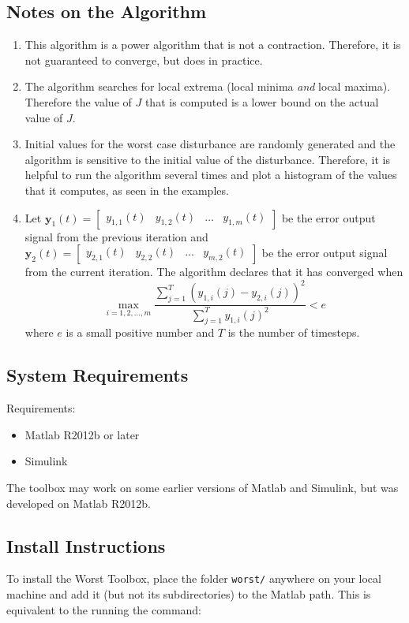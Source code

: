 \documentclass{article}
\begin{document}
\subsection{Notes on the Algorithm} \label{algnotes}
\begin{enumerate}
\item This algorithm is a power algorithm that is not a contraction. Therefore,
it is not guaranteed to converge, but does in practice.

\item The algorithm searches for local extrema (local minima \emph{and} local
maxima). Therefore the value of $J$ that
is computed is a lower bound on the actual value of $J$.

\item Initial values for the worst case disturbance are randomly generated and
the algorithm is sensitive to the initial value of the disturbance. Therefore,
it is helpful to run the algorithm several times and plot a histogram of the
values that it computes, as seen in the examples.

\item Let $\mathbf{y}_1(t) = \begin{bmatrix}y_{1,1} (t) & y_{1,2}(t) & \dots &
y_{1,m}(t) \end{bmatrix}$ be the error output signal from the previous iteration
and $\mathbf{y}_2(t) = \begin{bmatrix} y_{2,1}(t) & y_{2,2}(t) & \dots &
y_{m,2}(t) \end{bmatrix}$ be the error output signal from the current iteration.
The algorithm declares that it has converged when \[ \max_{i = 1,2,\dots,m}
\frac{\sum_{j=1}^T (y_{1,i}(j) - y_{2,i}(j))^2}{\sum_{j=1}^T y_{1,i}(j)^2 } < e
\] where $e$ is a small positive number and $T$ is the number of timesteps.

\end{enumerate}


\subsection{System Requirements}
Requirements:
\begin{itemize}
\item Matlab R2012b or later
\item Simulink
\end{itemize}
The toolbox may work on some earlier versions of Matlab and Simulink, but was
developed on Matlab R2012b.


\subsection{Install Instructions}
To install the Worst Toolbox, place the folder \texttt{worst/} anywhere on your
local machine and add it (but not its subdirectories) to the Matlab path. This
is equivalent to the running the command:
\end{document}
